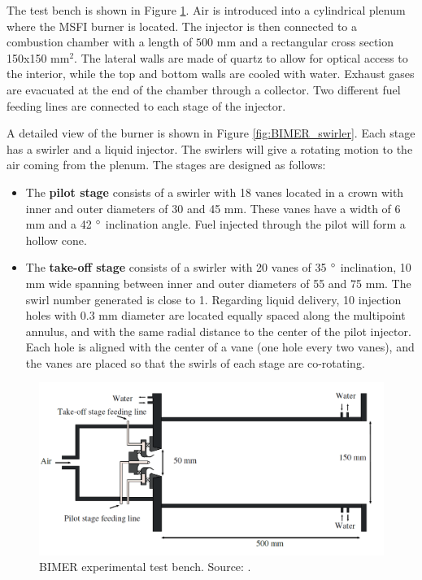 The test bench is shown in Figure \ref{fig:BIMER_test_bench_expe_maquette}. Air is introduced into a cylindrical plenum where the MSFI burner is located. The injector is then connected to a combustion chamber with a length of $500$ mm and a rectangular cross section 150x150 mm$^2$. The lateral walls are made of quartz to allow for optical access to the interior, while the top and bottom walls are cooled with water. Exhaust gases are evacuated at the end of the chamber through a collector. Two different fuel feeding lines are connected to each stage of the injector. 

A detailed view of the burner is shown in Figure \ref{fig:BIMER_swirler}. Each stage has a swirler and a liquid injector. The swirlers will give a rotating motion to the air coming from the plenum. The stages are designed as follows:

\begin{itemize}

	\item The \textbf{pilot stage} consists of a swirler with 18 vanes located in a crown with inner and outer diameters of 30 and 45 mm. These vanes have a width of 6 mm and a 42 $\degree$ inclination angle. Fuel injected through the pilot will form a hollow cone.
	
	\item The \textbf{take-off stage} consists of a swirler with 20 vanes of 35 $\degree$ inclination, 10 mm wide spanning between inner and outer diameters of 55 and 75 mm. The swirl number generated is close to 1. Regarding liquid delivery, 10 injection holes with $0.3$ mm diameter are located equally spaced along the multipoint annulus, and with the same radial distance to the center of the pilot injector. Each hole is aligned with the center of a vane (one hole every two vanes), and the vanes are placed so that the swirls of each stage are co-rotating.

\end{itemize}

\begin{figure}[h!]
	\centering
	\includegraphics[scale=0.35]{./part3_applications/figures_ch7_aero/BIMER_test_bench_expe_maquette}
	\caption[BIMER experimental test bench]{BIMER experimental test bench. Source: .}
	\label{fig:BIMER_test_bench_expe_maquette}
\end{figure}


